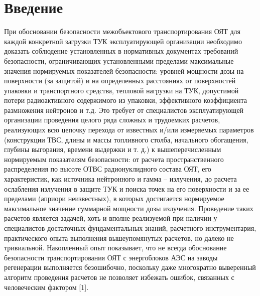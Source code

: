 \documentclass[14pt]{article}
\begin{document}
	\section{Введение}
	\hspace{0.4cm}
	При обосновании безопасности межобъектового транспортирования
ОЯТ для каждой конкретной загрузки ТУК эксплуатирующей организации
необходимо доказать соблюдение установленных в нормативных документах
требований безопасности, ограничивающих установленными пределами
максимальные значения нормируемых показателей безопасности: уровней
мощности дозы на поверхности (за защитой) и на определенных расстояниях
от поверхностей упаковки и транспортного средства, тепловой нагрузки на
ТУК, допустимой потери радиоактивного содержимого из упаковки,
эффективного коэффициента размножения нейтронов и т.д. Это требует от
специалистов эксплуатирующей организации проведения целого ряда
сложных и трудоемких расчетов, реализующих всю цепочку перехода от
известных и/или измеряемых параметров (конструкции ТВС, длины и массы
топливного столба, начального обогащения, глубины выгорания, времени
выдержки и т. д.) к вышеперечисленным нормируемым показателям
безопасности: от расчета пространственного распределения по высоте ОТВС
радионуклидного
состава
ОЯТ,
его
характеристик,
как
источника
нейтронного и гамма – излучения, до расчета ослабления излучения в защите
ТУК и поиска точек на его поверхности и за ее пределами (априори
неизвестных), в которых достигается нормируемое максимальное значение
суммарной мощности дозы излучения.
Проведение таких расчетов является задачей, хоть и вполне реализуемой
при наличии у специалистов достаточных фундаментальных знаний,
расчетного
инструментария,
практического
опыта
выполнения
вышеупомянутых расчетов, но далеко не тривиальной. Накопленный опыт
показывает, что не всегда обоснование безопасности транспортирования
ОЯТ с энергоблоков АЭС на заводы регенерации выполняется безошибочно,
поскольку даже многократно выверенный алгоритм проведения расчетов не
позволяет избежать ошибок, связанных с человеческим фактором [1].
	
\end{document}

